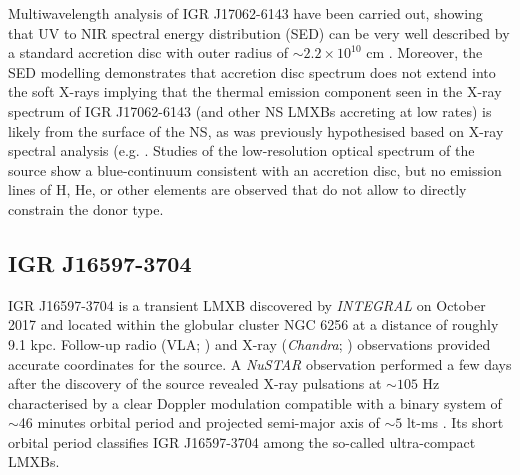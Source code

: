 \documentclass[graybox]{svmult}
\def \inte {{\em INTEGRAL\xspace}}
\def \chandra {{\em Chandra\xspace}}
\def \nustar{{\em NuSTAR\xspace}}
\begin{document}
Multiwavelength analysis of IGR J17062-6143 have been carried out, showing that UV to NIR spectral energy distribution (SED) can be very well described by a standard accretion disc with outer radius of $\sim2.2\times10^{10}$ cm \cite{HernandezSantisteban2019}. Moreover, the SED modelling demonstrates that accretion disc spectrum does not extend into the soft X-rays implying that the thermal emission component seen in the X-ray spectrum of IGR J17062-6143 (and other NS LMXBs accreting at low rates) is likely from the surface of the NS, as was previously hypothesised based on X-ray spectral analysis (e.g. \cite{ArmasPadilla2013,Degenaar2017}. Studies of the low-resolution optical spectrum of the source show a blue-continuum consistent with an accretion disc, but no emission lines of H, He, or other elements are observed that do not allow to directly constrain the donor type.

\subsection{IGR J16597-3704}

IGR J16597-3704 is a transient LMXB discovered by \inte{} on October 2017 \cite{Bozzo2017} and located within the globular cluster NGC 6256 at a distance of roughly 9.1 kpc. Follow-up radio (VLA; \cite{Tetarenko2017}) and X-ray (\chandra{}; \cite{Chakrabarty2017}) observations provided accurate coordinates for the source. 
A \nustar{} observation performed a few days after the discovery of the source revealed X-ray pulsations at $\sim 105$ Hz characterised by a clear Doppler modulation compatible with a binary system of $\sim$46 minutes orbital period and projected semi-major axis of $\sim5$ lt-ms \cite{Sanna2018a}. Its short orbital period classifies IGR J16597-3704 among the so-called ultra-compact LMXBs. 
\end{document}

